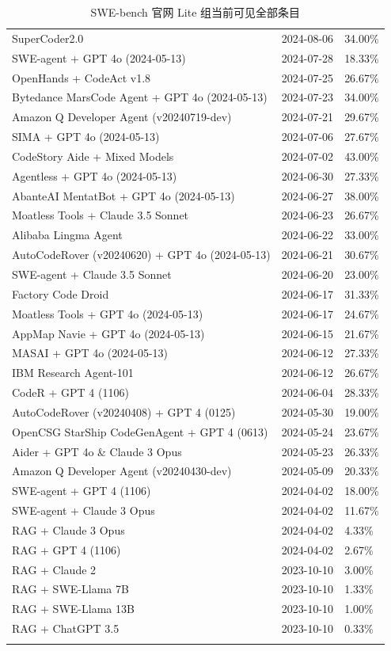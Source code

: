 \documentclass[UTF8,a4paper,11pt]{ctexart}
\begin{document}
\begin{center}
{\begin{longtable}{L{10.1cm} C{1.7cm} C{1.8cm}}
SuperCoder2.0 & 2024-08-06 & 34.00\% \\
SWE-agent + GPT 4o (2024-05-13) & 2024-07-28 & 18.33\% \\
OpenHands + CodeAct v1.8 & 2024-07-25 & 26.67\% \\
Bytedance MarsCode Agent + GPT 4o (2024-05-13) & 2024-07-23 & 34.00\% \\
Amazon Q Developer Agent (v20240719-dev) & 2024-07-21 & 29.67\% \\
SIMA + GPT 4o (2024-05-13) & 2024-07-06 & 27.67\% \\
CodeStory Aide + Mixed Models & 2024-07-02 & 43.00\% \\
Agentless + GPT 4o (2024-05-13) & 2024-06-30 & 27.33\% \\
AbanteAI MentatBot + GPT 4o (2024-05-13) & 2024-06-27 & 38.00\% \\
Moatless Tools + Claude 3.5 Sonnet & 2024-06-23 & 26.67\% \\
Alibaba Lingma Agent & 2024-06-22 & 33.00\% \\
AutoCodeRover (v20240620) + GPT 4o (2024-05-13) & 2024-06-21 & 30.67\% \\
SWE-agent + Claude 3.5 Sonnet & 2024-06-20 & 23.00\% \\
Factory Code Droid & 2024-06-17 & 31.33\% \\
Moatless Tools + GPT 4o (2024-05-13) & 2024-06-17 & 24.67\% \\
AppMap Navie + GPT 4o (2024-05-13) & 2024-06-15 & 21.67\% \\
MASAI + GPT 4o (2024-05-13) & 2024-06-12 & 27.33\% \\
IBM Research Agent-101 & 2024-06-12 & 26.67\% \\
CodeR + GPT 4 (1106) & 2024-06-04 & 28.33\% \\
AutoCodeRover (v20240408) + GPT 4 (0125) & 2024-05-30 & 19.00\% \\
OpenCSG StarShip CodeGenAgent + GPT 4 (0613) & 2024-05-24 & 23.67\% \\
Aider + GPT 4o \& Claude 3 Opus & 2024-05-23 & 26.33\% \\
Amazon Q Developer Agent (v20240430-dev) & 2024-05-09 & 20.33\% \\
SWE-agent + GPT 4 (1106) & 2024-04-02 & 18.00\% \\
SWE-agent + Claude 3 Opus & 2024-04-02 & 11.67\% \\
RAG + Claude 3 Opus & 2024-04-02 & 4.33\% \\
RAG + GPT 4 (1106) & 2024-04-02 & 2.67\% \\
RAG + Claude 2 & 2023-10-10 & 3.00\% \\
RAG + SWE-Llama 7B & 2023-10-10 & 1.33\% \\
RAG + SWE-Llama 13B & 2023-10-10 & 1.00\% \\
RAG + ChatGPT 3.5 & 2023-10-10 & 0.33\% \\
\bottomrule
\caption{SWE-bench 官网 Lite 组当前可见全部条目}
\end{longtable}
}
\end{center}
\end{document}
